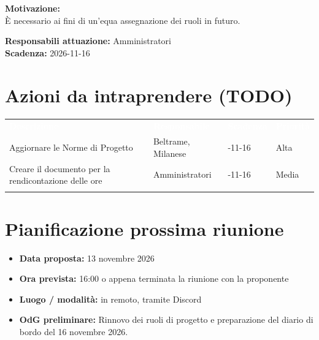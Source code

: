 \documentclass[12pt,a4paper]{article}
\newcommand{\tightlist}{\setlength{\itemsep}{1pt}\setlength{\parskip}{0pt}}
\begin{document}
\textbf{Motivazione:} \\
È necessario ai fini di un'equa assegnazione dei ruoli in futuro.

\textbf{Responsabili attuazione:} Amministratori \\
\textbf{Scadenza:} 2026-11-16

\hypertarget{azioni-da-intraprendere}{
\section{Azioni da intraprendere (TODO)}}

\begin{center}
\begin{tabularx}{\linewidth}{>{\hsize=2.0\hsize\raggedright\arraybackslash}X >{\hsize=1.0\hsize\raggedright\arraybackslash}X >{\hsize=0.5\hsize\centering\arraybackslash}X >{\hsize=0.5\hsize\centering\arraybackslash}X}
\rowcolor{bfblue}\textcolor{white}{\textbf{Descrizione}} & \textcolor{white}{\textbf{Responsabile}} & \textcolor{white}{\textbf{Scadenza}} & \textcolor{white}{\textbf{Priorità}} \\
Aggiornare le Norme di Progetto & Beltrame, Milanese & 2026-11-16 & Alta \\ \arrayrulecolor{bfline}\hline
Creare il documento per la rendicontazione delle ore & Amministratori & 2026-11-16 & Media \\ \arrayrulecolor{bfline}\hline
\end{tabularx}
\end{center}

\hypertarget{prossima-riunione}{%
\section{Pianificazione prossima riunione}}

\begin{itemize}
\tightlist
\item \textbf{Data proposta:} 13 novembre 2026
\item \textbf{Ora prevista:} 16:00 o appena terminata la riunione con la proponente
\item \textbf{Luogo / modalità:} in remoto, tramite Discord 
\item \textbf{OdG preliminare:} Rinnovo dei ruoli di progetto e preparazione del diario di bordo del 16 novembre 2026.
\end{itemize}
\end{document}

